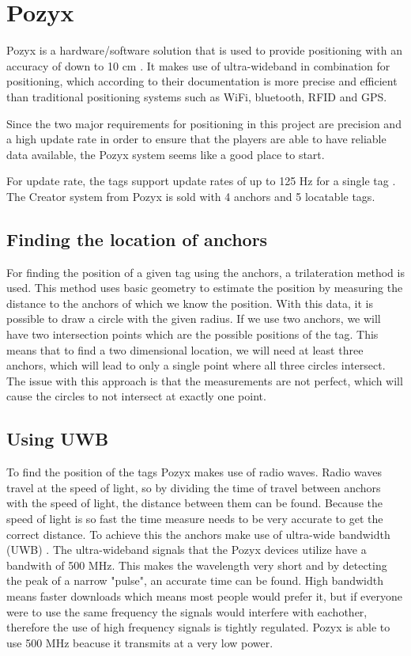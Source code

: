 \section{Pozyx}
Pozyx is a hardware/software solution that is used to provide positioning with an accuracy of down to 10 cm \cite{pozyx}.
It makes use of ultra-wideband in combination for positioning, which according to their documentation is more precise and efficient than traditional positioning systems such as WiFi, bluetooth, RFID and GPS.

Since the two major requirements for positioning in this project are precision and a high update rate in order to ensure that the players are able to have reliable data available, the Pozyx system seems like a good place to start.

For update rate, the tags support update rates of up to 125 Hz for a single tag \cite{pozyx}.
The Creator system from Pozyx is sold with 4 anchors and 5 locatable tags.
\subsection{Finding the location of anchors}
For finding the position of a given tag using the anchors, a trilateration method is used.
This method uses basic geometry to estimate the position by measuring the distance to the anchors of which we know the position.
With this data, it is possible to draw a circle with the given radius.
If we use two anchors, we will have two intersection points which are the possible positions of the tag.
This means that to find a two dimensional location, we will need at least three anchors, which will lead to only a single point where all three circles intersect.
The issue with this approach is that the measurements are not perfect, which will cause the circles to not intersect at exactly one point.

\subsection{Using UWB}
To find the position of the tags Pozyx makes use of radio waves. 
Radio waves travel at the speed of light, so by dividing the time of travel between anchors with the speed of light, the distance between them can be found.
Because the speed of light is so fast the time measure needs to be very accurate to get the correct distance.
To achieve this the anchors make use of ultra-wide bandwidth (UWB) \cite{pozyx-UWB}.
The ultra-wideband signals that the Pozyx devices utilize have a bandwith of 500 MHz.
This makes the wavelength very short and by detecting the peak of a narrow "pulse", an accurate time can be found.
High bandwidth means faster downloads which means most people would prefer it, but if everyone were to use the same frequency the signals would interfere with eachother, therefore the use of high frequency signals is tightly regulated.
Pozyx is able to use 500 MHz beacuse it transmits at a very low power.

